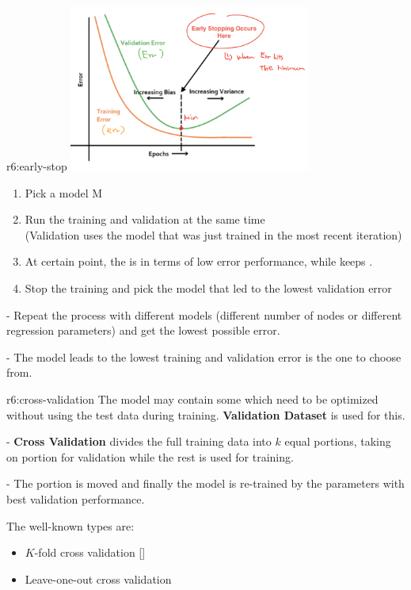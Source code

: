 \documentclass{tron}
\begin{document}
\begin{remark}{r6:early-stop}
	\includegraphics[width=300px]{Figs/Lec6/early-stop}
	
	\begin{enumerate}
		\item Pick a model M
		\item Run the training and validation at the same time \\
			(Validation uses the model that was just trained in the most recent iteration)
		\item At certain point, the  is  in terms of low error performance, while  keeps .
		\item Stop the training and pick the model that led to the lowest validation error
	\end{enumerate}
	
	- Repeat the process with different models (different number of nodes or different regression parameters) and get the lowest possible error. 

	- The model leads to the lowest training and validation error is the one to choose from.
\end{remark}

\begin{remark}{r6:cross-validation}
	The model may contain some  which need to be optimized without using the test data during training. \textbf{Validation Dataset} is used for this.
	
	- \textbf{Cross Validation} divides the full training data into $k$ equal portions, taking on portion for validation while the rest is used for training. 
	
	- The portion is moved and finally the model is re-trained by the parameters with best validation performance.
	
	The well-known types are:
	\begin{itemize}
		\item $K$-fold cross validation []
		\item Leave-one-out cross validation
	\end{itemize}
\end{remark}
\end{document}
